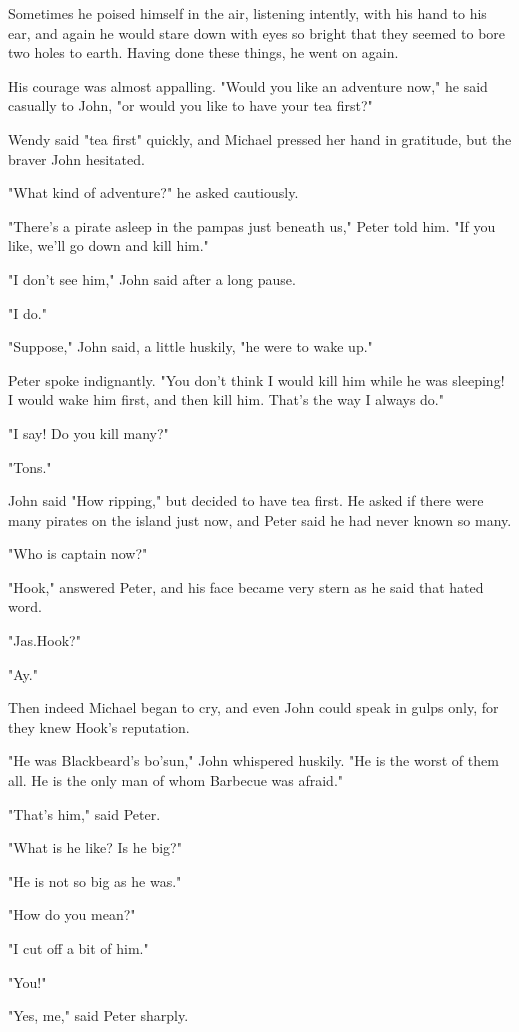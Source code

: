 Sometimes he poised himself in the air,
listening intently, with his hand to his ear,
and again he would stare down with eyes so bright that they seemed to bore two holes to earth.
Having done these things, he went on again.

His courage was almost appalling.
"Would you like an adventure now," he said casually to John,
"or would you like to have your tea first?"

Wendy said "tea first" quickly, and Michael pressed her hand in gratitude,
but the braver John hesitated.

"What kind of adventure?\@" he asked cautiously.

"There's a pirate asleep in the pampas just beneath us," Peter told him.
"If you like, we'll go down and kill him."

"I don't see him," John said after a long pause.

"I do."

"Suppose," John said, a little huskily, "he were to wake up."

Peter spoke indignantly.
"You don't think I would kill him while he was sleeping!
I would wake him first, and then kill him.
That's the way I always do."

"I say!
Do you kill many?"

"Tons."

John said "How ripping," but decided to have tea first.
He asked if there were many pirates on the island just now,
and Peter said he had never known so many.

"Who is captain now?"

"Hook," answered Peter, and his face became very stern as he said that hated word.

"Jas.\@ Hook?"

"Ay."

Then indeed Michael began to cry, and even John could speak in gulps only, for they knew Hook's reputation.

"He was Blackbeard's bo'sun," John whispered huskily.
"He is the worst of them all.
He is the only man of whom Barbecue was afraid."

"That's him," said Peter.

"What is he like?
Is he big?"

"He is not so big as he was."

"How do you mean?"

"I cut off a bit of him."

"You!"

"Yes, me," said Peter sharply.

